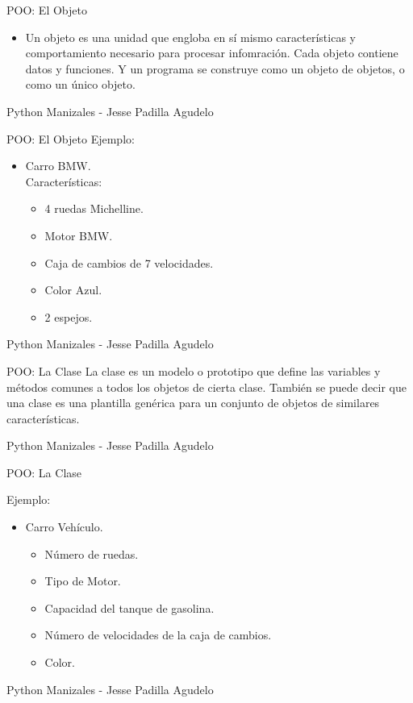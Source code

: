 \begin{frame}{POO: El Objeto}
\justifying
\begin{itemize}
\item Un objeto es una unidad que engloba en sí mismo características y comportamiento necesario para procesar infomración. Cada objeto contiene datos y funciones. Y un programa se construye como un objeto de objetos, o como un único objeto.
\end{itemize}
{\tiny Python Manizales - Jesse Padilla Agudelo}
\end{frame}

\begin{frame}{POO: El Objeto}
\justifying
Ejemplo:
\begin{itemize}
\item Carro BMW.\\
Características:
	\begin{itemize}
	\item 4 ruedas 	Michelline.
	\item Motor BMW.
	\item Caja de cambios de 7 velocidades.
	\item Color Azul.
	\item 2 espejos.
	\end{itemize}
\end{itemize}
{\tiny Python Manizales - Jesse Padilla Agudelo}
\end{frame}

\begin{frame}{POO: La Clase}
\justifying
La clase es un modelo o prototipo que define las variables y métodos comunes a todos los objetos de cierta clase. También se puede decir que una clase es una plantilla genérica para un conjunto de objetos de similares características.

{\tiny Python Manizales - Jesse Padilla Agudelo}
\end{frame}

\begin{frame}{POO: La Clase}
\justifying

Ejemplo:
\begin{itemize}
\item Carro Vehículo.
	\begin{itemize}
	\item Número de ruedas.
	\item Tipo de Motor.
	\item Capacidad del tanque de gasolina.
	\item Número de velocidades de la caja de cambios.
	\item Color.
	\end{itemize}
\end{itemize}

{\tiny Python Manizales - Jesse Padilla Agudelo}
\end{frame}

